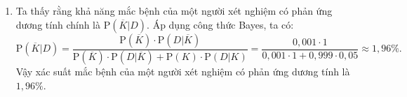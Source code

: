 \begin{vd}[CD]
{\begin{enumerate}
\begin{center}
			\end{center}
			\item Ta thấy rằng khả năng mắc bệnh của một người xét nghiệm có phản ứng dương tính chính là $\mathrm{P}\left(\overline{K}|D\right)$. Áp dụng công thức Bayes, ta có:
			\[\mathrm{P}\left(\overline{K}|D\right)=\dfrac{\mathrm{P}\left(\overline{K}\right)\cdot \mathrm{P}\left(D|\overline{K}\right)}{\mathrm{P}\left(\overline{K}\right)\cdot \mathrm{P}\left(D|\overline{K}\right) + \mathrm{P}(K)\cdot\mathrm{P}(D|K)}=\dfrac{0{,}001\cdot 1}{0{,}001\cdot 1 + 0{,}999 \cdot 0{,}05}\approx 1{,}96\%.\]
			Vậy xác suất mắc bệnh của một người xét nghiệm có phản ứng dương tính là $1{,}96\%$.
		\end{enumerate}
	}
\end{vd}

